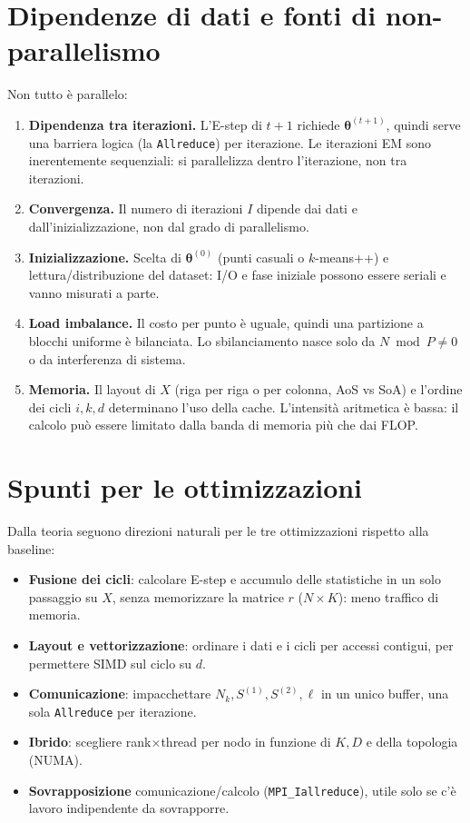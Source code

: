 \documentclass[11pt,a4paper]{article}
\newcommand{\bth}{\boldsymbol{\theta}}
\theoremstyle{definition}
\begin{document}
\section{Dipendenze di dati e fonti di non-parallelismo}
Non tutto è parallelo:
\begin{enumerate}
  \item \textbf{Dipendenza tra iterazioni.} L'E-step di $t+1$ richiede $\bth^{(t+1)}$,
        quindi serve una barriera logica (la \texttt{Allreduce}) per iterazione.
        Le iterazioni EM sono inerentemente sequenziali: si parallelizza dentro
        l'iterazione, non tra iterazioni.
  \item \textbf{Convergenza.} Il numero di iterazioni $I$ dipende dai dati e
        dall'inizializzazione, non dal grado di parallelismo.
  \item \textbf{Inizializzazione.} Scelta di $\bth^{(0)}$ (punti casuali o
        $k$-means++) e lettura/distribuzione del dataset: I/O e fase iniziale
        possono essere seriali e vanno misurati a parte.
  \item \textbf{Load imbalance.} Il costo per punto è uguale, quindi una
        partizione a blocchi uniforme è bilanciata. Lo sbilanciamento nasce
        solo da $N\bmod P\neq 0$ o da interferenza di sistema.
  \item \textbf{Memoria.} Il layout di $X$ (riga per riga o per colonna, AoS vs SoA) e l'ordine
        dei cicli $i,k,d$ determinano l'uso della cache. L'intensità
        aritmetica è bassa: il calcolo può essere limitato dalla banda di memoria
        più che dai FLOP.
\end{enumerate}

\section{Spunti per le ottimizzazioni}
Dalla teoria seguono direzioni naturali per le tre ottimizzazioni rispetto alla baseline:
\begin{itemize}
  \item \textbf{Fusione dei cicli}: calcolare E-step e accumulo delle statistiche in un solo
        passaggio su $X$, senza memorizzare la matrice $r$ ($N\times K$): meno traffico di memoria.
  \item \textbf{Layout e vettorizzazione}: ordinare i dati e i cicli per accessi contigui, per
        permettere SIMD sul ciclo su $d$.
  \item \textbf{Comunicazione}: impacchettare $N_k,S^{(1)},S^{(2)},\ell$ in un unico buffer,
        una sola \texttt{Allreduce} per iterazione.
  \item \textbf{Ibrido}: scegliere rank$\times$thread per nodo in funzione di $K,D$ e della
        topologia (NUMA).
  \item \textbf{Sovrapposizione} comunicazione/calcolo (\texttt{MPI\_Iallreduce}), utile solo se c'è lavoro
        indipendente da sovrapporre.
\end{itemize}
\end{document}
